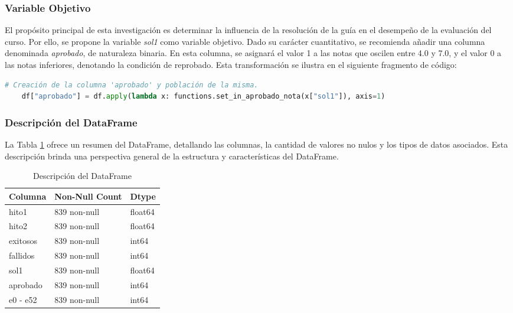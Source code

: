 \subsubsection{Variable Objetivo}

El propósito principal de esta investigación es determinar la influencia de la resolución de la guía en el desempeño de la evaluación del curso. Por ello, se propone la variable \textit{sol1} como variable objetivo. Dado su carácter cuantitativo, se recomienda añadir una columna denominada \textit{aprobado}, de naturaleza binaria. En esta columna, se asignará el valor 1 a las notas que oscilen entre 4.0 y 7.0, y el valor 0 a las notas inferiores, denotando la condición de reprobado. Esta transformación se ilustra en el siguiente fragmento de código:

\begin{lstlisting}[language=Python, caption=Tratamiento de la Variable Objetivo ,label=lst:trat_varObjetivo]
    # Creación de la columna 'aprobado' y población de la misma.
    df["aprobado"] = df.apply(lambda x: functions.set_in_aprobado_nota(x["sol1"]), axis=1)
\end{lstlisting}

\subsubsection{Descripción del DataFrame}

La Tabla \ref{tab:descripcion_dataframe} ofrece un resumen del DataFrame, detallando las columnas, la cantidad de valores no nulos y los tipos de datos asociados. Esta descripción brinda una perspectiva general de la estructura y características del DataFrame.

\begin{table}[H]
    \centering
    \caption{Descripción del DataFrame}
    \begin{tabular}{lll}
        \hline
        \textbf{Columna} & \textbf{Non-Null Count} & \textbf{Dtype} \\
        \hline
        hito1            & 839 non-null            & float64        \\
        hito2            & 839 non-null            & float64        \\
        exitosos         & 839 non-null            & int64          \\
        fallidos         & 839 non-null            & int64          \\
        sol1             & 839 non-null            & float64        \\
        aprobado         & 839 non-null            & int64          \\
        e0 - e52         & 839 non-null            & int64          \\
        \hline
    \end{tabular}%
    \label{tab:descripcion_dataframe}%
\end{table}%

